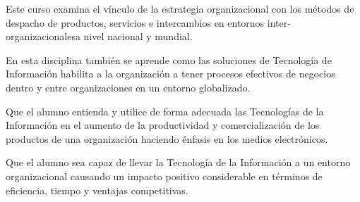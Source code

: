 \begin{syllabus}


\begin{justification}
Este curso examina el vínculo de la estrategia organizacional con los métodos de despacho de productos, servicios e intercambios en entornos inter-organizacionalesa nivel nacional y mundial.

En esta disciplina también se aprende como las soluciones de Tecnología de Información habilita a la organización a tener procesos efectivos de negocios dentro y entre organizaciones en un entorno globalizado.
\end{justification}

\begin{goals}
\item Que el alumno entienda y utilice de forma adecuada las Tecnologías de la Información en el aumento de la productividad y comercialización de los productos de una organización haciendo énfasis en los medios electrónicos.
\item Que el alumno sea capaz de llevar la Tecnología de la Información a un entorno organizacional causando un impacto positivo considerable en términos de eficiencia, tiempo y ventajas competitivas.
\end{goals}

\begin{outcomes}
\end{outcomes}


\end{syllabus}
